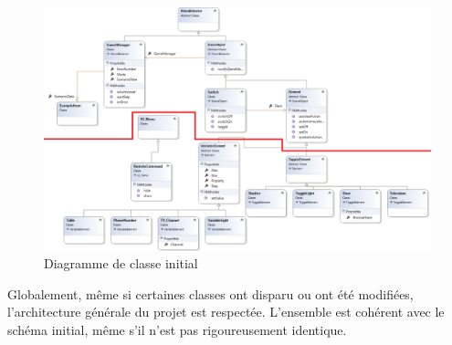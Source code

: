 \begin{figure}[h]
	\centering
		\includegraphics[width=\linewidth]{7-RapportFinal/img/diagClasses_rectif.png}
		\caption{Diagramme de classe initial}
		\label{diagClasses_rectif}
	
\end{figure}

Globalement, même si certaines classes ont disparu ou ont été modifiées, l'architecture générale du projet est respectée. L'ensemble est cohérent avec le schéma initial, même s'il n'est pas rigoureusement identique.







